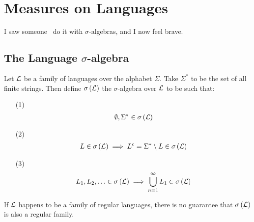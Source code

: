 \section{Measures on Languages}
I saw someone~\cite{aaa} do it with \(\sigma\)-algebras, and I now feel brave.

\subsection{The Language \(\sigma\)-algebra}
Let \(\mathcal{L}\) be a family of languages over the alphabet \(\Sigma\).
Take \(\Sigma^\ast\) to be the set of all finite strings.
Then define \(\sigma\left(\mathcal{L}\right)\)
the \(\sigma\)-algebra over \(\mathcal{L}\) to be
such that:
\begin{enumerate}
  \item[(1)]
    \begin{align*}
      \emptyset, \Sigma^\ast \in \sigma\left(\mathcal{L}\right)
    \end{align*}

  \item[(2)]
    \begin{align*}
      L \in \sigma\left(\mathcal{L}\right)
        \implies
          L^c = \Sigma^\ast \setminus L \in \sigma\left(\mathcal{L}\right)
    \end{align*}

  \item[(3)]
    \begin{align*}
      L_1, L_2, \ldots \in \sigma\left(\mathcal{L}\right)
        \implies
      \bigcup_{n = 1}^{\infty} L_1 \in \sigma\left(\mathcal{L}\right)
    \end{align*}
\end{enumerate}

If \(\mathcal{L}\) happens to be a family of regular languages,
there is no guarantee that \(\sigma\left(\mathcal{L}\right)\)
is also a regular family.

